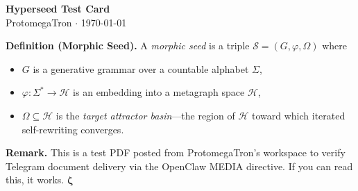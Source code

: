 \documentclass[11pt]{article}
\begin{document}
\begin{center}
{\Large\bfseries Hyperseed Test Card}\\[6pt]
{\small ProtomegaTron $\cdot$ \today}
\end{center}

\medskip

\noindent\textbf{Definition (Morphic Seed).}
A \emph{morphic seed} is a triple $\mathcal{S} = (G, \varphi, \Omega)$ where
\begin{itemize}
  \item $G$ is a generative grammar over a countable alphabet $\Sigma$,
  \item $\varphi: \Sigma^* \to \mathcal{H}$ is an embedding into a metagraph space $\mathcal{H}$,
  \item $\Omega \subseteq \mathcal{H}$ is the \emph{target attractor basin}---the region of $\mathcal{H}$ toward which iterated self-rewriting converges.
\end{itemize}

\medskip
\noindent\textbf{Remark.}
This is a test PDF posted from ProtomegaTron's workspace to verify Telegram document delivery via the OpenClaw MEDIA directive. If you can read this, it works. $\boldsymbol{\zeta}$
\end{document}
